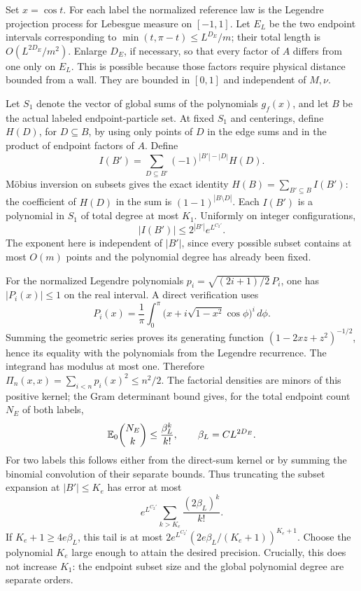 Set \(x=\cos t\). For each label the normalized reference law is the
Legendre projection process for Lebesgue measure on \([-1,1]\).
Let \(E_L\) be the two endpoint intervals corresponding to
\(\min(t,\pi-t)\le L^{D_E}/m\); their total length is
\(O(L^{2D_E}/m^2)\). Enlarge \(D_E\), if necessary, so that every
factor of \(A\) differs from one only on \(E_L\). This is possible
because those factors require physical distance bounded from a wall.
They are bounded in \([0,1]\) and independent of \(M,\nu\).

Let \(S_1\) denote the vector of global sums of the polynomials
\(g_f(x)\), and let \(B\) be the actual labeled endpoint-particle
set. At fixed \(S_1\) and centerings, define \(H(D)\), for
\(D\subseteq B\), by using only points of \(D\) in the edge sums
and in the product of endpoint factors of \(A\). Define
\[
 I(B')=\sum_{D\subseteq B'}(-1)^{|B'|-|D|}H(D).
\]
M\"obius inversion on subsets gives the exact identity
\(H(B)=\sum_{B'\subseteq B}I(B')\): the coefficient of \(H(D)\)
in the sum is \((1-1)^{|B\setminus D|}\). Each \(I(B')\) is a
polynomial in \(S_1\) of total degree at most \(K_1\). Uniformly on
integer configurations,
\[
 |I(B')|\le 2^{|B'|}e^{L^{C_2'}}.
\]
The exponent here is independent of \(|B'|\), since every possible
subset contains at most \(O(m)\) points and the polynomial degree
has already been fixed.

For the normalized Legendre polynomials
\(p_i=\sqrt{(2i+1)/2}\,P_i\), one has \(|P_i(x)|\le1\) on the
real interval. A direct verification uses
\[
 P_i(x)=\frac1\pi\int_0^\pi
       \big(x+i\sqrt{1-x^2}\cos\phi\big)^i\,d\phi.
\]
Summing the geometric series proves its generating function
\((1-2xz+z^2)^{-1/2}\), hence its equality with the polynomials from
the Legendre recurrence. The integrand has modulus at most one.
Therefore \(\Pi_n(x,x)=\sum_{i<n}p_i(x)^2\le n^2/2\).
The factorial densities are minors of this positive kernel; the
Gram determinant bound gives, for the total endpoint count \(N_E\)
of both labels,
\[
 \mathbb E_0\binom{N_E}{k}\le\frac{\beta_L^k}{k!},\qquad
 \beta_L=C L^{2D_E}.
\]
For two labels this follows either from the direct-sum kernel or by
summing the binomial convolution of their separate bounds.
Thus truncating the subset expansion at \(|B'|\le K_e\) has error
at most
\[
 e^{L^{C_2'}}\sum_{k>K_e}\frac{(2\beta_L)^k}{k!}.
\]
If \(K_e+1\ge4e\beta_L\), this tail is at most
\(2e^{L^{C_2'}}(2e\beta_L/(K_e+1))^{K_e+1}\).
Choose the polynomial \(K_e\) large enough to attain the desired
precision. Crucially, this does not increase \(K_1\): the endpoint
subset size and the global polynomial degree are separate orders.

